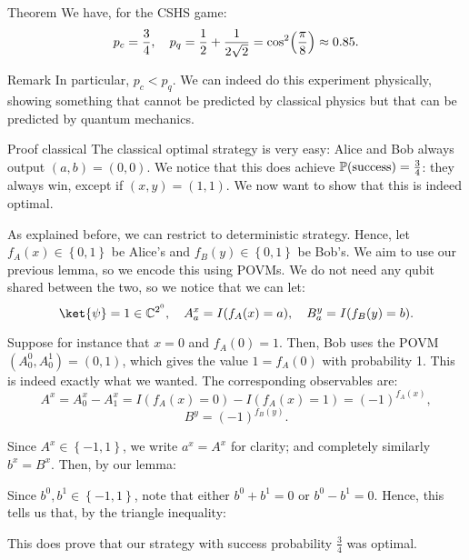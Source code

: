 \documentclass[a4paper]{article}
\begin{document}
\begin{parag}{Theorem}
    We have, for the CSHS game: 
    \[p_c = \frac{3}{4}, \mathspace p_q = \frac{1}{2} + \frac{1}{2\sqrt{2}} = \cos^2\left(\frac{\pi}{8}\right) \approx 0.85.\]
    
    \begin{subparag}{Remark}
        In particular, $p_c < p_q$. We can indeed do this experiment physically, showing something that cannot be predicted by classical physics but that can be predicted by quantum mechanics.
    \end{subparag}

    \begin{subparag}{Proof classical}
        The classical optimal strategy is very easy: Alice and Bob always output $\left(a, b\right) = \left(0, 0\right)$. We notice that this does achieve $\prob\left(\text{success}\right) = \frac{3}{4}$: they always win, except if $\left(x, y\right) = \left(1, 1\right)$. We now want to show that this is indeed optimal.

        As explained before, we can restrict to deterministic strategy. Hence, let $f_A\left(x\right) \in \left\{0, 1\right\}$ be Alice's and $f_B\left(y\right) \in \left\{0, 1\right\}$ be Bob's. We aim to use our previous lemma, so we encode this using POVMs. We do not need any qubit shared between the two, so we notice that we can let:
        \[\ket{\psi} = 1 \in \mathbb{C}^{2^0}, \mathspace A^x_a = I\left(f_A\left(x\right) = a\right), \mathspace B^y_a = I\left(f_B\left(y\right) = b\right).\]
        
        Suppose for instance that $x = 0$ and $f_A\left(0\right) = 1$. Then, Bob uses the POVM $\left(A_0^0, A_0^1\right) = \left(0, 1\right)$, which gives the value $1 = f_A\left(0\right)$ with probability 1. This is indeed exactly what we wanted. The corresponding observables are: 
        \[A^x = A^x_0 - A^x_1 = I\left(f_A\left(x\right) = 0\right) - I\left(f_A\left(x\right) = 1\right) = \left(-1\right)^{f_A\left(x\right)},\]
        \[B^y = \left(-1\right)^{f_B\left(y\right)}.\]
        
        Since $A^x \in \left\{-1, 1\right\}$, we write $a^x = A^x$ for clarity; and completely similarly $b^x = B^x$. Then, by our lemma:

        Since $b^0, b^1 \in \left\{-1, 1\right\}$, note that either $b^0 + b^1 = 0$ or $b^0 - b^1 = 0$. Hence, this tells us that, by the triangle inequality: 
        
        This does prove that our strategy with success probability $\frac{3}{4}$ was optimal.
    \end{subparag}
\end{parag}
\end{document}
